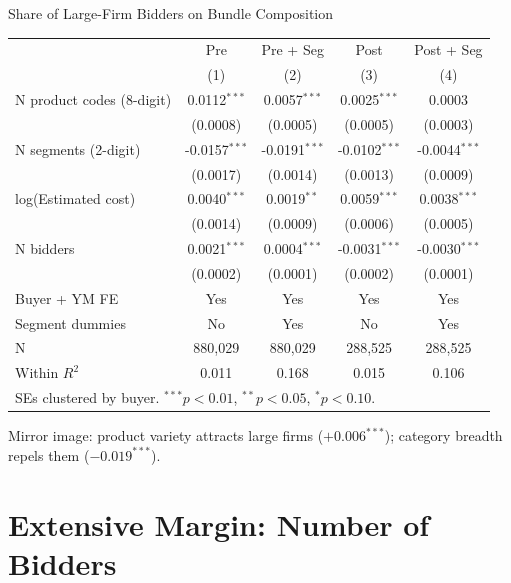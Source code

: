 \documentclass[9pt,aspectratio=169]{beamer}
\begin{document}
\begin{frame}{Share of Large-Firm Bidders on Bundle Composition}
\centering\small
\begin{tabular}{lcccc}
\toprule
 & Pre & Pre + Seg & Post & Post + Seg \\
 & (1) & (2) & (3) & (4) \\
\midrule
N product codes (8-digit) & 0.0112$^{***}$ & 0.0057$^{***}$ & 0.0025$^{***}$ & 0.0003 \\
 & (0.0008) & (0.0005) & (0.0005) & (0.0003) \\[2pt]
N segments (2-digit) & -0.0157$^{***}$ & -0.0191$^{***}$ & -0.0102$^{***}$ & -0.0044$^{***}$ \\
 & (0.0017) & (0.0014) & (0.0013) & (0.0009) \\[2pt]
log(Estimated cost) & 0.0040$^{***}$ & 0.0019$^{**}$ & 0.0059$^{***}$ & 0.0038$^{***}$ \\
 & (0.0014) & (0.0009) & (0.0006) & (0.0005) \\[2pt]
N bidders & 0.0021$^{***}$ & 0.0004$^{***}$ & -0.0031$^{***}$ & -0.0030$^{***}$ \\
 & (0.0002) & (0.0001) & (0.0002) & (0.0001) \\[2pt]
\midrule
Buyer + YM FE & Yes & Yes & Yes & Yes \\
Segment dummies & No & Yes & No & Yes \\
N & 880,029 & 880,029 & 288,525 & 288,525 \\
Within $R^2$ & 0.011 & 0.168 & 0.015 & 0.106 \\
\bottomrule
\multicolumn{5}{l}{\footnotesize SEs clustered by buyer. $^{***}p<0.01$, $^{**}p<0.05$, $^{*}p<0.10$.} \\
\end{tabular}

\medskip
\small Mirror image: product variety attracts large firms ($+0.006^{***}$); category breadth repels them ($-0.019^{***}$).
\end{frame}

\section{Extensive Margin: Number of Bidders}
\end{document}
